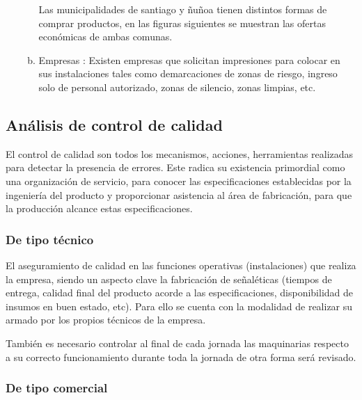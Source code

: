 \begin{enumerate}[1)]
\begin{enumerate}[a)]
Las municipalidades de santiago y ñuñoa tienen distintos formas de comprar productos, en las figuras siguientes se muestran las ofertas económicas de ambas comunas. 



    \item Empresas : Existen empresas que solicitan impresiones para colocar en sus instalaciones tales como demarcaciones de zonas de riesgo, ingreso solo de personal autorizado, zonas de silencio, zonas limpias, etc.



	\end{enumerate}
	\end{enumerate}

	
	\subsection{Análisis de control de calidad}
		El control de calidad son todos los mecanismos, acciones, herramientas realizadas para detectar la presencia de errores. Este radica su existencia primordial como una organización de servicio, para conocer las especificaciones establecidas por la ingeniería del producto y proporcionar asistencia al área de fabricación, para que la producción alcance estas especificaciones.	


      	\subsubsection{De tipo técnico}
      	
			El aseguramiento de calidad en las funciones operativas (instalaciones) que realiza la empresa, siendo un aspecto clave la fabricación de señaléticas (tiempos de entrega, calidad final del producto acorde a las especificaciones, disponibilidad de insumos en buen estado, etc). Para ello se cuenta con la modalidad de realizar su armado por los propios técnicos de la empresa.
	
	
	También es necesario controlar al final de cada jornada las maquinarias respecto a su correcto funcionamiento durante toda la jornada de otra forma será revisado.
	
	
	\subsubsection{De tipo comercial}
	
